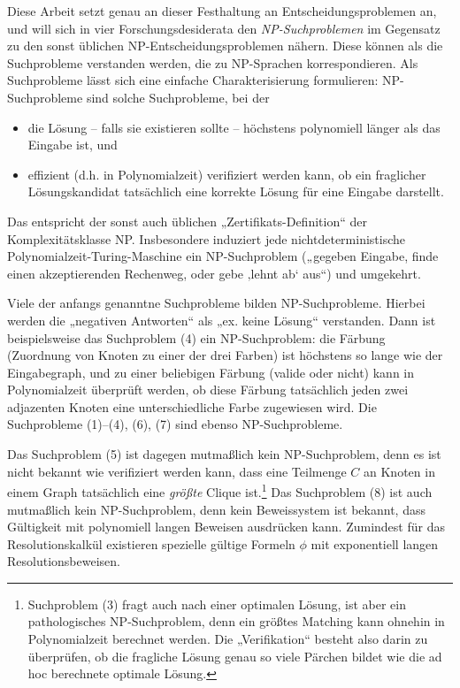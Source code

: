 Diese Arbeit setzt genau an dieser Festhaltung an Entscheidungsproblemen an, und will sich in vier Forschungsdesiderata den \emph{NP-Suchproblemen} im Gegensatz zu den sonst üblichen NP-Entscheidungsproblemen nähern.
Diese können als die Suchprobleme verstanden werden, die zu NP-Sprachen korrespondieren. Als Suchprobleme lässt sich eine einfache Charakterisierung formulieren: NP-Suchprobleme sind solche Suchprobleme, bei der 
\begin{itemize}
    \item die Lösung – falls sie existieren sollte – höchstens polynomiell länger als das Eingabe ist, und 
    \item effizient (d.h. in Polynomialzeit) verifiziert werden kann, ob ein fraglicher Lösungskandidat tatsächlich eine korrekte Lösung für eine Eingabe darstellt.
\end{itemize}
Das entspricht der sonst auch üblichen „Zertifikats-Definition“ der Komplexitätsklasse NP. Insbesondere induziert jede nichtdeterministische Polynomialzeit-Turing-Maschine ein NP-Suchproblem („gegeben Eingabe, finde einen akzeptierenden Rechenweg, oder gebe ‚lehnt ab‘ aus“) und umgekehrt.

Viele der anfangs genanntne Suchprobleme bilden NP-Suchprobleme. Hierbei werden die „negativen Antworten“ als „ex. keine Lösung“ verstanden. Dann ist beispielsweise das Suchproblem (4) ein NP-Suchproblem: die Färbung (Zuordnung von Knoten zu einer der drei Farben) ist höchstens so lange wie der Eingabegraph, und zu einer beliebigen Färbung (valide oder nicht) kann in Polynomialzeit überprüft werden, ob diese Färbung tatsächlich jeden zwei adjazenten Knoten eine unterschiedliche Farbe zugewiesen wird.
Die Suchprobleme (1)–(4), (6), (7) sind ebenso NP-Suchprobleme. 

Das Suchproblem (5) ist dagegen mutmaßlich kein NP-Suchproblem, denn es ist nicht bekannt wie verifiziert werden kann, dass eine Teilmenge $C$ an Knoten in einem Graph tatsächlich eine \emph{größte} Clique ist.\footnote{Suchproblem (3) fragt auch nach einer optimalen Lösung, ist aber ein pathologisches NP-Suchproblem, denn ein größtes Matching kann ohnehin in Polynomialzeit berechnet werden. Die „Verifikation“ besteht also darin zu überprüfen, ob die fragliche Lösung genau so viele Pärchen bildet wie die ad hoc berechnete optimale Lösung.}
Das Suchproblem (8) ist auch mutmaßlich kein NP-Suchproblem, denn kein Beweissystem ist bekannt, dass Gültigkeit mit polynomiell langen Beweisen ausdrücken kann. Zumindest für das Resolutionskalkül existieren spezielle gültige Formeln $\phi$ mit exponentiell langen Resolutionsbeweisen.


